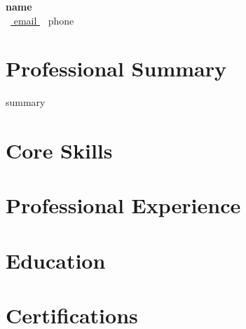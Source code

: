 \documentclass[a4paper,11pt]{article}
\begin{document}
{\LARGE \textbf{ {{ name }} }}\\
\faEnvelope\ \href{mailto:{{ email }}}{{ email }} \quad
\faPhone\ {{ phone }}

\section*{Professional Summary}
{{ summary }}

\section*{Core Skills}

\section*{Professional Experience}

\section*{Education}

\section*{Certifications}
\end{document}
